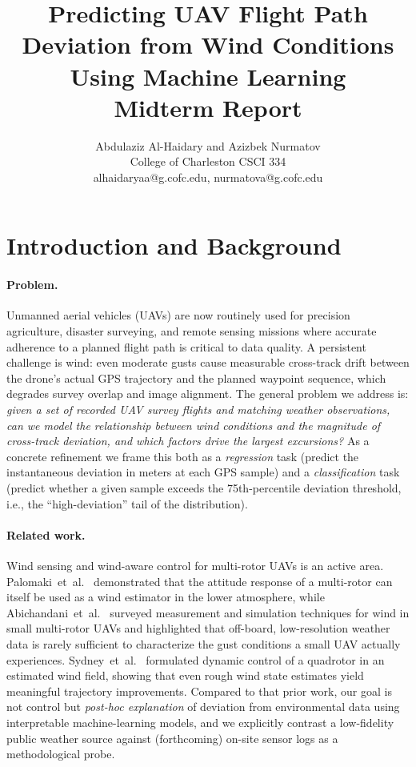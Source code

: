 \documentclass[10pt]{article}
\title{\vspace{-2.5em}\textbf{Predicting UAV Flight Path Deviation from Wind Conditions Using Machine Learning}\\[2pt]\large Midterm Report\vspace{-1em}}
\author{
  Abdulaziz Al-Haidary \quad and \quad Azizbek Nurmatov\\[-1pt]
  \normalsize College of Charleston \quad CSCI 334\\
  \normalsize alhaidaryaa@g.cofc.edu, nurmatova@g.cofc.edu
}
\date{}
\begin{document}
\maketitle
\vspace{-2.2em}

\section{Introduction and Background}

\paragraph{Problem.} Unmanned aerial vehicles (UAVs) are now routinely used for precision agriculture, disaster surveying, and remote sensing missions where accurate adherence to a planned flight path is critical to data quality. A persistent challenge is wind: even moderate gusts cause measurable cross-track drift between the drone's actual GPS trajectory and the planned waypoint sequence, which degrades survey overlap and image alignment. The general problem we address is: \emph{given a set of recorded UAV survey flights and matching weather observations, can we model the relationship between wind conditions and the magnitude of cross-track deviation, and which factors drive the largest excursions?} As a concrete refinement we frame this both as a \emph{regression} task (predict the instantaneous deviation in meters at each GPS sample) and a \emph{classification} task (predict whether a given sample exceeds the 75th-percentile deviation threshold, i.e., the ``high-deviation'' tail of the distribution).

\paragraph{Related work.} Wind sensing and wind-aware control for multi-rotor UAVs is an active area. Palomaki~et~al.\ \cite{palomaki2017} demonstrated that the attitude response of a multi-rotor can itself be used as a wind estimator in the lower atmosphere, while Abichandani~et~al.\ \cite{abichandani2020} surveyed measurement and simulation techniques for wind in small multi-rotor UAVs and highlighted that off-board, low-resolution weather data is rarely sufficient to characterize the gust conditions a small UAV actually experiences. Sydney~et~al.\ \cite{sydney2013} formulated dynamic control of a quadrotor in an estimated wind field, showing that even rough wind state estimates yield meaningful trajectory improvements. Compared to that prior work, our goal is not control but \emph{post-hoc explanation} of deviation from environmental data using interpretable machine-learning models, and we explicitly contrast a low-fidelity public weather source against (forthcoming) on-site sensor logs as a methodological probe.
\end{document}
